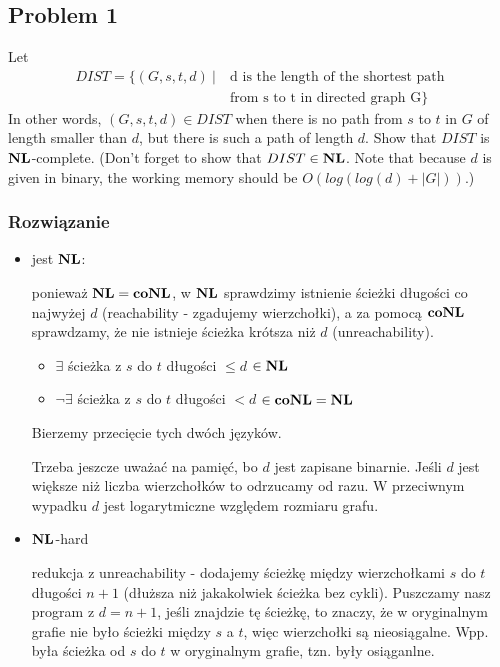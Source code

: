 
\subsection{Problem 1}

Let
\begin{align*}
DIST = \{(G, s, t, d)\ |\ &
    \textrm{d is the length of the shortest path}\\
    & \textrm{from s to t in directed graph G}
\}
\end{align*} 
In other words, $(G,s,t,d) \in DIST$ when there is no path from $s$ to $t$ in $G$ of length smaller than $d$, but there is such a path of length $d$. Show that $DIST$ is $\textbf{NL}$-complete. (Don’t forget to show that $DIST \in \textbf{NL}$. Note that because $d$ is given in binary, the working memory should be $O(log(log(d)+|G|))$.)

\subsubsection*{Rozwiązanie}

\begin{itemize}
    \item jest $\textbf{NL}$:
    
    ponieważ $\textbf{NL} = \textbf{co}\textbf{NL}$, w $\textbf{NL}$ sprawdzimy istnienie ścieżki długości co najwyżej $d$ (reachability - zgadujemy wierzchołki), a za pomocą $\textbf{co}\textbf{NL}$ sprawdzamy, że nie istnieje ścieżka krótsza niż $d$ (unreachability).
    
    \begin{itemize}
        \item $\exists$ ścieżka z $s$ do $t$ długości $\leq d$ $\in \textbf{NL}$
        \item $\neg \exists$ ścieżka z $s$ do $t$ długości $< d$ $\in \textbf{co}\textbf{NL} = \textbf{NL}$
    \end{itemize}
    
    Bierzemy przecięcie tych dwóch języków.
    
    Trzeba jeszcze uważać na pamięć, bo $d$ jest zapisane binarnie. Jeśli $d$ jest większe niż liczba wierzchołków to odrzucamy od razu. W przeciwnym wypadku $d$ jest logarytmiczne względem rozmiaru grafu.
    
    \item $\textbf{NL}$-hard
    
    redukcja z unreachability - dodajemy ścieżkę między wierzchołkami $s$ do $t$ długości $n+1$ (dłuższa niż jakakolwiek ścieżka bez cykli). Puszczamy nasz program z $d = n+1$, jeśli znajdzie tę ścieżkę, to znaczy, że w oryginalnym grafie nie było ścieżki między $s$ a $t$, więc wierzchołki są nieosiągalne. Wpp. była ścieżka od $s$ do $t$ w oryginalnym grafie, tzn. były osiąganlne.
\end{itemize}

